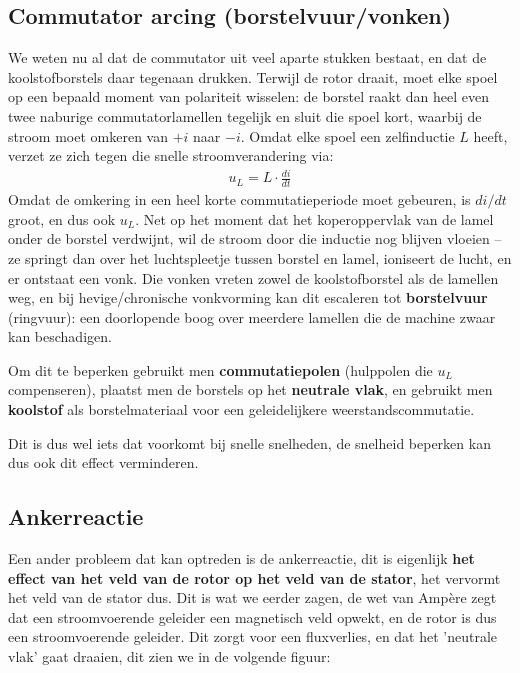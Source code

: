 \subsection{Commutator arcing (borstelvuur/vonken)}
We weten nu al dat de commutator uit veel aparte stukken bestaat, en dat de
koolstofborstels daar tegenaan drukken.
Terwijl de rotor draait, moet elke spoel op een bepaald moment van polariteit wisselen:
de borstel raakt dan heel even twee naburige commutatorlamellen tegelijk en sluit die
spoel kort, waarbij de stroom moet omkeren van $+i$ naar $-i$.
Omdat elke spoel een zelfinductie $L$ heeft, verzet ze zich tegen die snelle
stroomverandering via:
\begin{align*}
    u_L = L \cdot \frac{di}{dt}
\end{align*}
Omdat de omkering in een heel korte commutatieperiode moet gebeuren, is $di/dt$ groot, en
dus ook $u_L$.
Net op het moment dat het koperoppervlak van de lamel onder de borstel verdwijnt, wil de
stroom door die inductie nog blijven vloeien -- ze springt dan over het luchtspleetje
tussen borstel en lamel, ioniseert de lucht, en er ontstaat een vonk.
Die vonken vreten zowel de koolstofborstel als de lamellen weg, en bij hevige/chronische
vonkvorming kan dit escaleren tot \textbf{borstelvuur} (ringvuur):
een doorlopende boog over meerdere lamellen die de machine zwaar kan beschadigen.

Om dit te beperken gebruikt men \textbf{commutatiepolen} (hulppolen die $u_L$
compenseren), plaatst men de borstels op het \textbf{neutrale vlak}, en gebruikt men
\textbf{koolstof} als borstelmateriaal voor een geleidelijkere weerstandscommutatie.

Dit is dus wel iets dat voorkomt bij snelle snelheden, de snelheid beperken kan dus ook
dit effect verminderen.

\newpage

\subsection{Ankerreactie}
Een ander probleem dat kan optreden is de ankerreactie, dit is eigenlijk \textbf{het effect
van het veld van de rotor op het veld van de stator}, het vervormt het veld van de stator
dus.
Dit is wat we eerder zagen, de wet van Ampère zegt dat een stroomvoerende geleider een
magnetisch veld opwekt, en de rotor is dus een stroomvoerende geleider.
Dit zorgt voor een fluxverlies, en dat het 'neutrale vlak' gaat draaien, dit zien we in de
volgende figuur:

